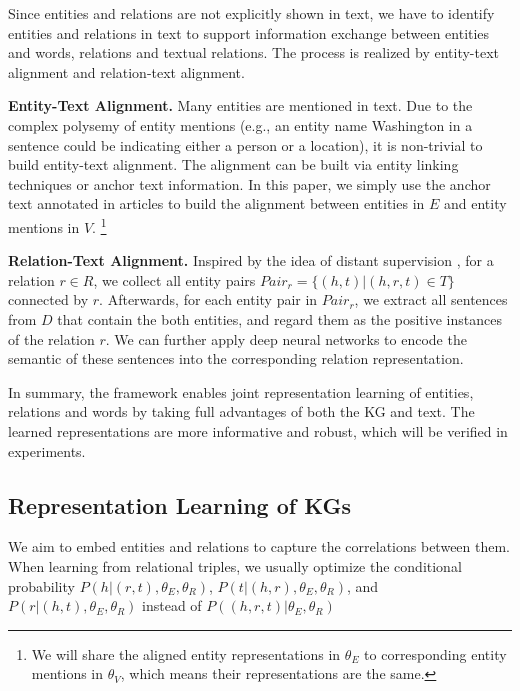 \documentclass[11pt,a4paper]{article}
\begin{document}
Since entities and relations are not explicitly shown in text, we have to identify entities and relations in text to support information exchange between entities and words, relations and textual relations. The process is realized by entity-text alignment and relation-text alignment.

\textbf{Entity-Text Alignment.} Many entities are mentioned in text. Due to the complex polysemy of entity mentions (e.g., an entity name Washington in a sentence could be indicating either a person or a location), it is non-trivial to build entity-text alignment. The alignment can be built via entity linking techniques or anchor text information. In this paper, we simply use the anchor text annotated in articles to build the alignment between entities in $E$ and entity mentions in $V$. \footnote{We will share the aligned entity representations in $\theta_E$ to corresponding entity mentions in $\theta_V$, which means their representations are the same.}

\textbf{Relation-Text Alignment.} Inspired by the idea of distant supervision \cite{min2013distant}, for a relation $r \in R$, we collect all entity pairs $Pair_{r} = \{(h, t) | (h, r, t) \in T \}$ connected by $r$. Afterwards, for each entity pair in $Pair_{r}$, we extract all sentences from $D$ that contain the both entities, and regard them as the positive instances of the relation $r$. We can further apply deep neural networks to encode the semantic of these sentences into the corresponding relation representation.

In summary, the framework enables joint representation learning of entities, relations and words by taking full advantages of both the KG and text. The learned representations are more informative and robust, which will be verified in experiments.

\subsection{Representation Learning of KGs}
\label{sec:kg}

We aim to embed entities and relations to capture the correlations between them. When learning from relational triples, we usually optimize the conditional probability $P(h|(r, t),{\theta_E, \theta_R})$, $P(t|(h, r),{\theta_E, \theta_R})$, and $P(r|(h, t),{\theta_E, \theta_R})$ instead of $P((h, r, t)|{\theta_E, \theta_R})$
\end{document}
